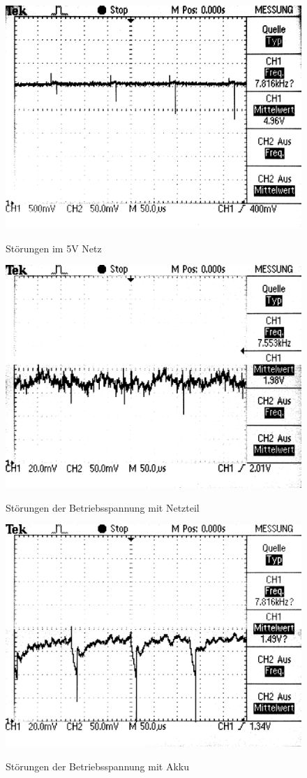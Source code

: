 \begin{figure}[H]
\centering
\includegraphics[width=.8\textwidth]{5V_supply.png}\\
\caption{Störungen im 5V Netz}%
\label{fig:5V Supply}
\end{figure}


\begin{figure}[H]
\centering
\includegraphics[width=.8\textwidth]{VCC_SUPPLY.png}\\
\caption{Störungen der Betriebsspannung mit Netzteil}%
\label{fig:power_supply}
\end{figure}


\begin{figure}[H]
\centering
\includegraphics[width=.8\textwidth]{VCC_AKKU.png}\\
\caption{Störungen der Betriebsspannung mit Akku}%
\label{fig:accu_supply}
\end{figure}





